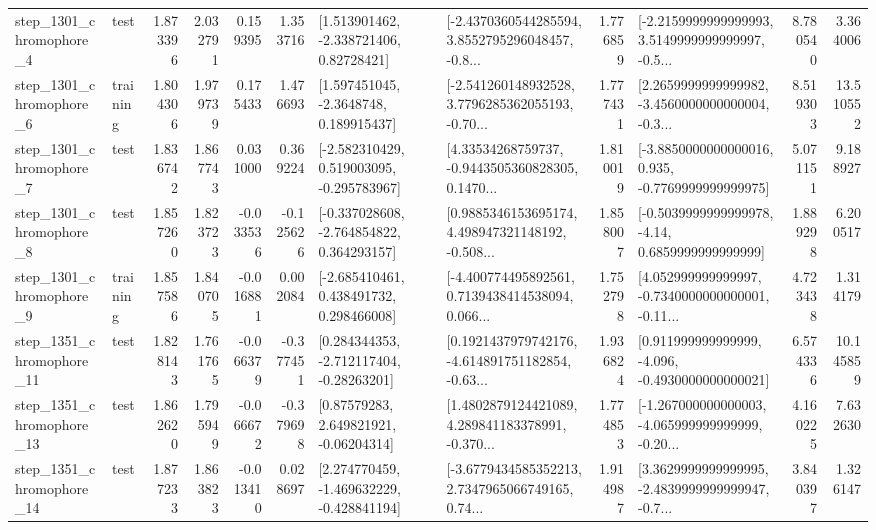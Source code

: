 \begin{tabular}{llrrrrllrlrr}
  step\_1301\_chromophore\_4 &      test &      1.873396 &    2.032791 &      0.159395 &  1.353716 &     [1.513901462, -2.338721406, 0.82728421] &  [-2.4370360544285594, 3.8552795296048457, -0.8... &       1.776859 &  [-2.2159999999999993, 3.5149999999999997, -0.5... &            8.780540 &          3.364006 \\
  step\_1301\_chromophore\_6 &  training &      1.804306 &    1.979739 &      0.175433 &  1.476693 &      [1.597451045, -2.3648748, 0.189915437] &  [-2.541260148932528, 3.7796285362055193, -0.70... &       1.777431 &  [2.2659999999999982, -3.4560000000000004, -0.3... &            8.519303 &         13.510552 \\
  step\_1301\_chromophore\_7 &      test &      1.836742 &    1.867743 &      0.031000 &  0.369224 &   [-2.582310429, 0.519003095, -0.295783967] &  [4.33534268759737, -0.9443505360828305, 0.1470... &       1.810019 &  [-3.8850000000000016, 0.935, -0.7769999999999975] &            5.071151 &          9.188927 \\
  step\_1301\_chromophore\_8 &      test &      1.857260 &    1.823723 &     -0.033536 & -0.125626 &   [-0.337028608, -2.764854822, 0.364293157] &  [0.9885346153695174, 4.498947321148192, -0.508... &       1.858007 &   [-0.5039999999999978, -4.14, 0.6859999999999999] &            1.889298 &          6.200517 \\
  step\_1301\_chromophore\_9 &  training &      1.857586 &    1.840705 &     -0.016881 &  0.002084 &    [-2.685410461, 0.438491732, 0.298466008] &  [-4.400774495892561, 0.7139438414538094, 0.066... &       1.752798 &  [4.052999999999997, -0.7340000000000001, -0.11... &            4.723438 &          1.314179 \\
 step\_1351\_chromophore\_11 &      test &      1.828143 &    1.761765 &     -0.066379 & -0.377451 &    [0.284344353, -2.712117404, -0.28263201] &  [0.1921437979742176, -4.614891751182854, -0.63... &       1.936824 &   [0.911999999999999, -4.096, -0.4930000000000021] &            6.574336 &         10.145859 \\
 step\_1351\_chromophore\_13 &      test &      1.862620 &    1.795949 &     -0.066672 & -0.379698 &      [0.87579283, 2.649821921, -0.06204314] &  [1.4802879124421089, 4.289841183378991, -0.370... &       1.774853 &  [-1.267000000000003, -4.065999999999999, -0.20... &            4.160225 &          7.632630 \\
 step\_1351\_chromophore\_14 &      test &      1.877233 &    1.863823 &     -0.013410 &  0.028697 &   [2.274770459, -1.469632229, -0.428841194] &  [-3.6779434585352213, 2.7347965066749165, 0.74... &       1.914987 &  [3.3629999999999995, -2.4839999999999947, -0.7... &            3.840397 &          1.326147 \\

\end{tabular}
